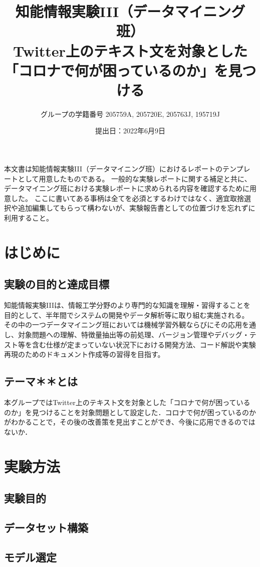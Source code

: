 \documentclass[a4paper, 11pt, titlepage]{jsarticle}
\title{知能情報実験III（データマイニング班）\\Twitter上のテキスト文を対象とした「コロナで何が困っているのか」を見つける}
\author{グループの学籍番号 205759A, 205720E, 205763J, 195719J}
\date{提出日：2022年6月9日}
\begin{document}
\maketitle
\tableofcontents
\clearpage

本文書は知能情報実験III（データマイニング班）におけるレポートのテンプレートとして用意したものである。
一般的な実験レポートに関する補足と共に、データマイニング班における実験レポートに求められる内容を確認するために用意した。
ここに書いてある事柄は全てを必須とするわけではなく、適宜取捨選択や追加編集してもらって構わないが、実験報告書としての位置づけを忘れずに利用すること。

\section{はじめに}
\subsection{実験の目的と達成目標}
知能情報実験IIIは、情報工学分野のより専門的な知識を理解・習得することを目的として、半年間でシステムの開発やデータ解析等に取り組む実施される。
その中の一つデータマイニング班においては機械学習外観ならびにその応用を通し、対象問題への理解、特徴量抽出等の前処理、バージョン管理やデバッグ・テスト等を含む仕様が定まっていない状況下における開発方法、コード解説や実験再現のためのドキュメント作成等の習得を目指す。

\subsection{テーマ＊＊とは}
本グループではTwitter上のテキスト文を対象とした「コロナで何が困っているのか」を見つけることを対象問題として設定した．コロナで何が困っているのかがわかることで，その後の改善策を見出すことができ、今後に応用できるのではないか．

\section{実験方法}
\subsection{実験目的}


\subsection{データセット構築}


\subsection{モデル選定}
\end{document}

